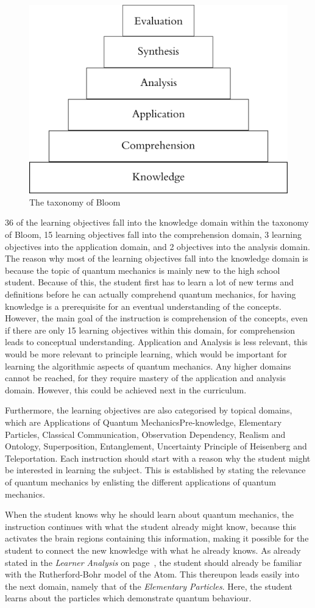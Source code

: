\documentclass[11pt,twoside]{report} %
\begin{document}
\begin{figure}[h]
\centering
\includegraphics[width=.4\textwidth]{bloom}
\caption{The taxonomy of Bloom \protect\cite{bloom}\label{fig:bloom}}
\end{figure}

36 of the learning objectives fall into the knowledge domain within the taxonomy of Bloom, 15 learning objectives fall into the comprehension domain, 3 learning objectives into the application domain, and 2 objectives into the analysis domain. The reason why most of the learning objectives fall into the knowledge domain is because the topic of quantum mechanics is mainly new to the high school student. Because of this, the student first has to learn a lot of new terms and definitions before he can actually comprehend quantum mechanics, for having knowledge is a prerequisite for an eventual understanding of the concepts. However, the main goal of the instruction is comprehension of the concepts, even if there are only 15 learning objectives within this domain, for comprehension leads to conceptual understanding. Application and Analysis is less relevant, this would be more relevant to principle learning, which would be important for learning the algorithmic aspects of quantum mechanics. Any higher domains cannot be reached, for they require mastery of the application and analysis domain. However, this could be achieved next in the curriculum.

Furthermore, the learning objectives are also categorised by topical domains, which are Applications of Quantum MechanicsPre-knowledge, Elementary Particles, Classical Communication, Observation Dependency, Realism and Ontology, Superposition, Entanglement, Uncertainty Principle of Heisenberg and Teleportation. Each instruction should start with a reason why the student might be interested in learning the subject. This is established by stating the relevance of quantum mechanics by enlisting the different applications of quantum mechanics.

When the student knows why he should learn about quantum mechanics, the instruction continues with what the student already might know, because this activates the brain regions containing this information, making it possible for the student to connect the new knowledge with what he already knows. As already stated in the \emph{Learner Analysis} on page~\pageref{sec:learneranalysis}, the student should already be familiar with the Rutherford-Bohr model of the Atom. This thereupon leads easily into the next domain, namely that of the \emph{Elementary Particles}. Here, the student learns about the particles which demonstrate quantum behaviour.
\end{document}
